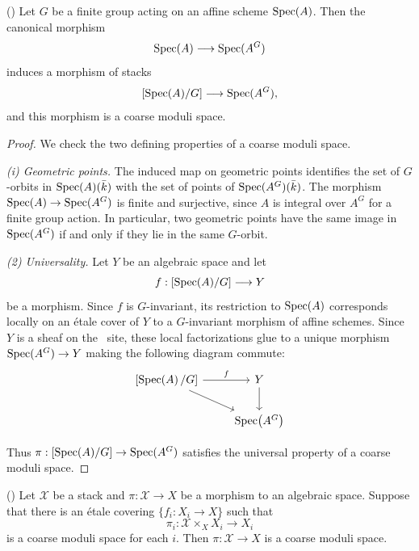 \begin{lemma}\label{lem:affine-quotient-finite-group}
	(\cite[Theorem 4.3.6. (1)]{alper2026stacks})
	Let $G$ be a finite group acting on an affine scheme $\operatorname{Spec}(A)$. Then the canonical morphism
	\[
	\operatorname{Spec}(A) \longrightarrow \operatorname{Spec}(A^G)
	\]
	induces a morphism of stacks
	\[
	[\operatorname{Spec}(A)/G] \longrightarrow \operatorname{Spec}(A^G),
	\]
	and this morphism is a coarse moduli space.
\end{lemma}

\begin{proof}
	We check the two defining properties of a coarse moduli space.
	
	\emph{(i) Geometric points.}
	The induced map on geometric points identifies the set of $G$-orbits in $\operatorname{Spec}(A)(\bar{k})$ with the set of points of $\operatorname{Spec}(A^G)(\bar{k})$.
	The morphism $\operatorname{Spec}(A) \to \operatorname{Spec}(A^G)$ is finite and surjective, since $A$ is integral over $A^G$ for a finite group action. In particular, two
	geometric points have the same image in $\operatorname{Spec}(A^G)$ if and only if they lie in the same $G$-orbit.
	
	\emph{(2) Universality.}
	Let $Y$ be an algebraic space and let
	\[
	f : [\operatorname{Spec}(A)/G] \longrightarrow Y
	\]
	be a morphism. Since $f$ is $G$-invariant, its restriction to $\operatorname{Spec}(A)$
	corresponds locally on an étale cover of $Y$ to a $G$-invariant morphism of
	affine schemes.
	Since $Y$ is a sheaf on the \etale\ site, these local factorizations glue
	to a unique morphism $\operatorname{Spec}(A^G)\to Y$ making the following diagram commute:
	\[\begin{tikzcd}
		{[\Specof{A}/G]} & Y \\
		& {\Specof{A^G}}
		\arrow["f", from=1-1, to=1-2]
		\arrow[from=1-1, to=2-2]
		\arrow[from=1-2, to=2-2]
	\end{tikzcd}\]
	
	Thus $\pi : [\operatorname{Spec}(A)/G]\to \operatorname{Spec}(A^G)$ satisfies the universal property of a
	coarse moduli space.
\end{proof}


\begin{lemma}\label{lem:coarse-moduli-etale-local}\label{lem:coarse-moduli-space-local-on-target}
	(\cite[Lemma 5.2.10]{alper2026stacks})
	Let $\mathcal{X}$ be a stack and $\pi : \mathcal{X} \to X$ be a morphism to an algebraic space. Suppose
	that there is an étale covering $\{f_i : X_i \to X\}$ such that
	\[
	\pi_i : \mathcal{X} \times_X X_i \longrightarrow X_i
	\]
	is a coarse moduli space for each $i$. Then $\pi : \mathcal{X} \to X$ is a
	coarse moduli space.
\end{lemma}


